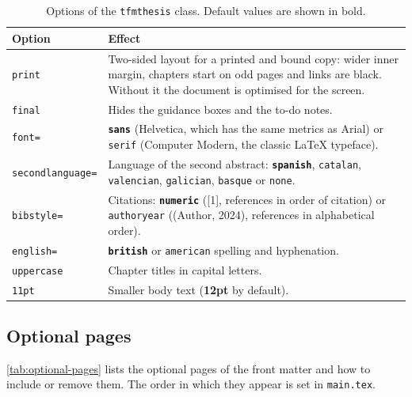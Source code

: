 \begin{table}[ht!]
  \centering
  \small
  \caption{Options of the \texttt{tfmthesis} class. Default values are shown in bold.}
  \label{tab:options}
  \begin{tabular}{@{}l p{10.6cm}@{}}
    \toprule
    \textbf{Option} & \textbf{Effect} \\
    \midrule
    \texttt{print}           & \raggedright Two-sided layout for a printed and bound copy: wider inner
                               margin, chapters start on odd pages and links are black.
                               Without it the document is optimised for the screen. \tabularnewline
    \texttt{final}           & \raggedright Hides the guidance boxes and the to-do notes. \tabularnewline
    \texttt{font=}           & \raggedright \textbf{\texttt{sans}} (Helvetica, which has the same
                               metrics as Arial) or \texttt{serif} (Computer Modern, the
                               classic \LaTeX{} typeface). \tabularnewline
    \texttt{secondlanguage=} & \raggedright Language of the second abstract: \textbf{\texttt{spanish}},
                               \texttt{catalan}, \texttt{valencian}, \texttt{galician},
                               \texttt{basque} or \texttt{none}. \tabularnewline
    \texttt{bibstyle=}       & \raggedright Citations: \textbf{\texttt{numeric}} ([1], references in
                               order of citation) or \texttt{authoryear} ((Author, 2024),
                               references in alphabetical order). \tabularnewline
    \texttt{english=}        & \raggedright \textbf{\texttt{british}} or \texttt{american} spelling and
                               hyphenation. \tabularnewline
    \texttt{uppercase}       & \raggedright Chapter titles in capital letters. \tabularnewline
    \texttt{11pt}            & \raggedright Smaller body text (\textbf{12pt} by default). \tabularnewline
    \bottomrule
  \end{tabular}
\end{table}

\subsection{Optional pages}\label{sec:optional-pages}

\autoref{tab:optional-pages} lists the optional pages of the front matter and how to include
or remove them. The order in which they appear is set in \texttt{main.tex}.

